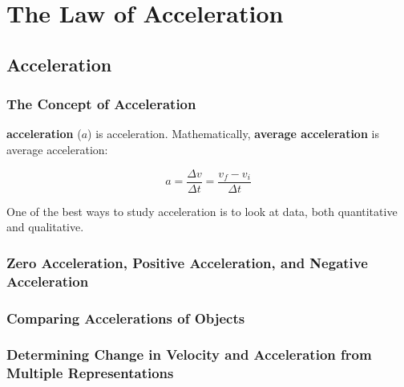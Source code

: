 \documentclass[dvipsnames]{article}
\newif\ifShowUnitIII                             %
\begin{document}

\fi

\clearpage

\section{The Law of Acceleration}

\ifShowUnitIII
\setcounter{example}{0}

\subsection{Acceleration}

\subsubsection{The Concept of Acceleration}

\textbf{\Gls{acceleration}} ($a$) is \glsdesc{acceleration}. Mathematically, \textbf{\gls{average acceleration}} is \gls{average acceleration}:

\begin{equation*}
    a = \frac{\Delta v}{\Delta t} = \frac{v_f - v_i}{\Delta t}
\end{equation*}

One of the best ways to study acceleration is to look at data, both quantitative and qualitative. 

\subsubsection{Zero Acceleration, Positive Acceleration, and Negative Acceleration}

\subsubsection{Comparing Accelerations of Objects}

\subsubsection{Determining Change in Velocity and Acceleration from Multiple Representations}
\end{document}
